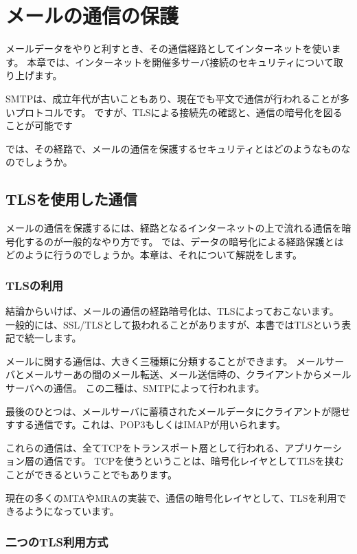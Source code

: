 \chapter{メールの通信の保護}

メールデータをやりと利すとき、その通信経路としてインターネットを使います。
本章では、インターネットを開催多サーバ接続のセキュリティについて取り上げます。

SMTPは、成立年代が古いこともあり、現在でも平文で通信が行われることが多いプロトコルです。
ですが、TLSによる接続先の確認と、通信の暗号化を図ることが可能です

では、その経路で、メールの通信を保護するセキュリティとはどのようなものなのでしょうか。

\section{TLSを使用した通信}

メールの通信を保護するには、経路となるインターネットの上で流れる通信を暗号化するのが一般的なやり方です。
では、データの暗号化による経路保護とはどのように行うのでしょうか。本章は、それについて解説をします。

\subsection{TLSの利用}

結論からいけば、メールの通信の経路暗号化は、TLSによっておこないます。
一般的には、SSL/TLSとして扱われることがありますが、本書ではTLSという表記で統一します。

メールに関する通信は、大きく三種類に分類することができます。
メールサーバとメールサーあの間のメール転送、メール送信時の、クライアントからメールサーバへの通信。
この二種は、SMTPによって行われます。

最後のひとつは、メールサーバに蓄積されたメールデータにクライアントが隠せすする通信です。これは、POP3もしくはIMAPが用いられます。

これらの通信は、全てTCPをトランスポート層として行われる、アプリケーション層の通信です。
TCPを使うということは、暗号化レイヤとしてTLSを挟むことができるということでもあります。

現在の多くのMTAやMRAの実装で、通信の暗号化レイヤとして、TLSを利用できるようになっています。

\subsection{二つのTLS利用方式}

